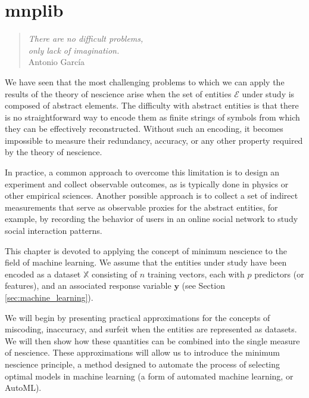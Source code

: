 %
%


\chapter{mnplib}
\label{chap:mnplib}

\begin{quote}
\begin{flushright}
\emph{There are no difficult problems,\\
only lack of imagination.}\\
Antonio García \\
\end{flushright}
\end{quote}
\bigskip

We have seen that the most challenging problems to which we can apply the results of the theory of nescience arise when the set of entities $\mathcal{E}$ under study is composed of abstract elements. The difficulty with abstract entities is that there is no straightforward way to encode them as finite strings of symbols from which they can be effectively reconstructed. Without such an encoding, it becomes impossible to measure their redundancy, accuracy, or any other property required by the theory of nescience.

In practice, a common approach to overcome this limitation is to design an experiment and collect observable outcomes, as is typically done in physics or other empirical sciences. Another possible approach is to collect a set of indirect measurements that serve as observable proxies for the abstract entities, for example, by recording the behavior of users in an online social network to study social interaction patterns.

This chapter is devoted to applying the concept of minimum nescience to the field of machine learning. We assume that the entities under study have been encoded as a dataset $\mathbb{X}$ consisting of $n$ training vectors, each with $p$ predictors (or features), and an associated response variable $\mathbf{y}$ (see Section \ref{sec:machine_learning}).

We will begin by presenting practical approximations for the concepts of miscoding, inaccuracy, and surfeit when the entities are represented as datasets. We will then show how these quantities can be combined into the single measure of nescience. These approximations will allow us to introduce the minimum nescience principle, a method designed to automate the process of selecting optimal models in machine learning (a form of automated machine learning, or AutoML).

